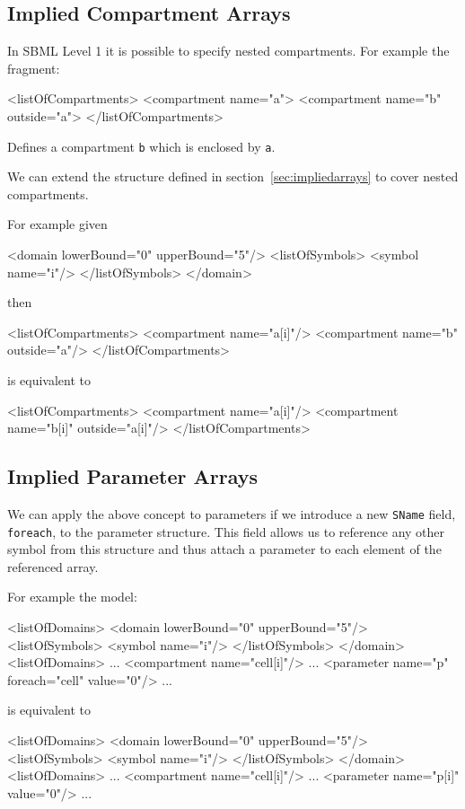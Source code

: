 \documentclass{cekarticle}
\begin{document}
\subsection{Implied Compartment Arrays}

In SBML Level 1 it is possible to specify nested compartments.
For example the fragment:

\begin{example}
<listOfCompartments>
    <compartment name="a">
    <compartment name="b" outside="a">
</listOfCompartments>
\end{example}

Defines a compartment \texttt{b} which is enclosed by \texttt{a}.

We can extend the structure defined in section~\ref{sec:impliedarrays} to cover
nested compartments.

For example given

\begin{example}
<domain lowerBound="0" upperBound="5"/>
    <listOfSymbols>
        <symbol name="i"/>
    </listOfSymbols>
</domain>
\end{example}

then

\begin{example}
<listOfCompartments>
    <compartment name="a[i]"/>
    <compartment name="b" outside="a"/>
</listOfCompartments>
\end{example}

is equivalent to

\begin{example}
<listOfCompartments>
    <compartment name="a[i]"/>
    <compartment name="b[i]" outside="a[i]"/>
</listOfCompartments>
\end{example}

\subsection{Implied Parameter Arrays}

We can apply the above concept to parameters if we introduce a
new \texttt{SName} field, \texttt{foreach}, to the parameter
structure. This field allows us to reference any other symbol
from this structure and thus attach a parameter to each element
of the referenced array.

For example the model:
\begin{example}
<listOfDomains>
    <domain lowerBound="0" upperBound="5"/>
        <listOfSymbols>
            <symbol name="i"/>
        </listOfSymbols>
    </domain>
<listOfDomains>
...
<compartment name="cell[i]"/>
...
<parameter name="p" foreach="cell" value="0"/>
...
\end{example}
is equivalent to
\begin{example}
<listOfDomains>
    <domain lowerBound="0" upperBound="5"/>
        <listOfSymbols>
            <symbol name="i"/>
        </listOfSymbols>
    </domain>
<listOfDomains>
...
<compartment name="cell[i]"/>
...
<parameter name="p[i]" value="0"/>
...
\end{example}
\end{document}

